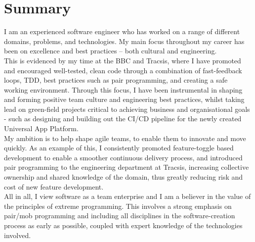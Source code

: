 \section{Summary}

I am an experienced software engineer who has worked on a range of different domains, problems, and technologies. My main focus throughout my career has been on excellence and best practices – both cultural and engineering.\\

This is evidenced by my time at the BBC and Tracsis, where I have promoted and encouraged well-tested, clean code through a combination of fast-feedback loops, TDD, best practices such as pair programming, and creating a safe working environment. Through this focus, I have been instrumental in shaping and forming positive team culture and engineering best practices, whilst taking lead on green-field projects critical to achieving business and organisational goals - such as designing and building out the CI/CD pipeline for the newly created Universal App Platform.\\

My ambition is to help shape agile teams, to enable them to innovate and move quickly. As an example of this, I consistently promoted feature-toggle based development to enable a smoother continuous delivery process, and introduced pair programming to the engineering department at Tracsis, increasing collective ownership and shared knowledge of the domain, thus greatly reducing risk and cost of new feature development.\\

All in all, I view software as a team enterprise and I am a believer in the value of the principles of extreme programming. This involves a strong emphasis on pair/mob programming and including all disciplines in the software-creation process as early as possible, coupled with expert knowledge of the technologies involved.\\
